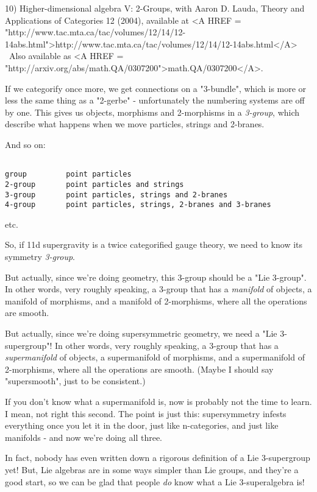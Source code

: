 10) Higher-dimensional algebra V: 2-Groups, with Aaron D. Lauda, 
Theory and Applications of Categories 12 (2004), available at
<A HREF = "http://www.tac.mta.ca/tac/volumes/12/14/12-14abs.html">http://www.tac.mta.ca/tac/volumes/12/14/12-14abs.html</A> \ 
Also available as <A HREF = "http://arxiv.org/abs/math.QA/0307200">math.QA/0307200</A>.

If we categorify once more, we get connections on a "3-bundle",
which is more or less the same thing as a "2-gerbe" - unfortunately
the numbering systems are off by one.   This gives us objects,
morphisms and 2-morphisms in a \emph{3-group}, which describe what 
happens when we move particles, strings and 2-branes.

And so on:


\begin{verbatim}

group         point particles
2-group       point particles and strings
3-group       point particles, strings and 2-branes
4-group       point particles, strings, 2-branes and 3-branes
\end{verbatim}
    
etc.  

So, if 11d supergravity is a twice categorified gauge theory,
we need to know its symmetry \emph{3-group}.  

But actually, since we're doing geometry, this 3-group should
be a "Lie 3-group".  In other words, very roughly speaking, 
a 3-group that has a \emph{manifold} of objects, a manifold of 
morphisms, and a manifold of 2-morphisms, where all the 
operations are smooth.

But actually, since we're doing supersymmetric geometry, we
need a "Lie 3-supergroup"!  In other words, very roughly
speaking, a 3-group that has a \emph{supermanifold} of objects, 
a supermanifold of morphisms, and a supermanifold of 2-morphisms, 
where all the operations are smooth.  (Maybe I should say 
"supersmooth", just to be consistent.)

If you don't know what a supermanifold is, now is probably 
not the time to learn.  I mean, not right this second.
The point is just this: supersymmetry 
infests everything once you let it in the door, just like 
n-categories, and just like manifolds - and now we're doing all three.   

In fact, nobody has even written down a rigorous definition
of a Lie 3-supergroup yet!  But, Lie algebras are in some ways 
simpler than Lie groups, and they're a good start, so we can
be glad that people \emph{do} know what a Lie 3-superalgebra is!

